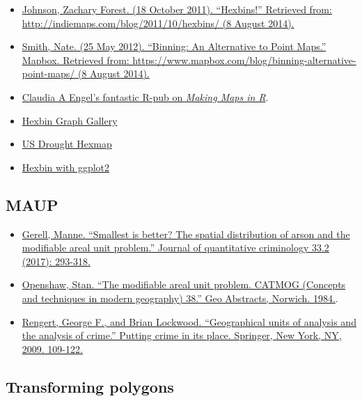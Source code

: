 \documentclass[]{book}
\providecommand{\tightlist}{%
  \setlength{\itemsep}{0pt}\setlength{\parskip}{0pt}}
\begin{document}
\begin{itemize}
\tightlist
\item
  \href{http://indiemaps.com/blog/2011/10/hexbins/}{Johnson, Zachary Forest. (18 October 2011). ``Hexbins!'' Retrieved from: http://indiemaps.com/blog/2011/10/hexbins/ (8 August 2014).}
\item
  \href{https://www.mapbox.com/blog/binning-alternative-point-maps/}{Smith, Nate. (25 May 2012). ``Binning: An Alternative to Point Maps.'' Mapbox. Retrieved from: https://www.mapbox.com/blog/binning-alternative-point-maps/ (8 August 2014).}
\item
  \href{http://www.rpubs.com/cengel248/97543}{Claudia A Engel's fantastic R-pub on \emph{Making Maps in R}}.
\item
  \href{https://www.r-graph-gallery.com/329-hexbin-map-for-distribution/}{Hexbin Graph Gallery}
\item
  \href{https://www.r-bloggers.com/u-s-drought-monitoring-with-hexbin-state-maps-in-r/}{US Drought Hexmap}
\item
  \href{http://santiago.begueria.es/2016/04/mapping-with-ggplot2-hexbin-maps/}{Hexbin with ggplot2}
\end{itemize}

\hypertarget{maup}{%
\subsection{MAUP}\label{maup}}

\begin{itemize}
\tightlist
\item
  \href{https://link.springer.com/article/10.1007/s10940-016-9297-6}{Gerell, Manne. ``Smallest is better? The spatial distribution of arson and the modifiable areal unit problem.'' Journal of quantitative criminology 33.2 (2017): 293-318.}
\item
  \href{https://www.uio.no/studier/emner/sv/iss/SGO9010/openshaw1983.pdf}{Openshaw, Stan. ``The modifiable areal unit problem. CATMOG (Concepts and techniques in modern geography) 38.'' Geo Abstracts, Norwich. 1984.}.
\item
  \href{https://link.springer.com/chapter/10.1007/978-0-387-09688-9_5}{Rengert, George F., and Brian Lockwood. ``Geographical units of analysis and the analysis of crime.'' Putting crime in its place. Springer, New York, NY, 2009. 109-122.}
\end{itemize}

\hypertarget{transforming-polygons}{%
\subsection{Transforming polygons}\label{transforming-polygons}}
\end{document}
